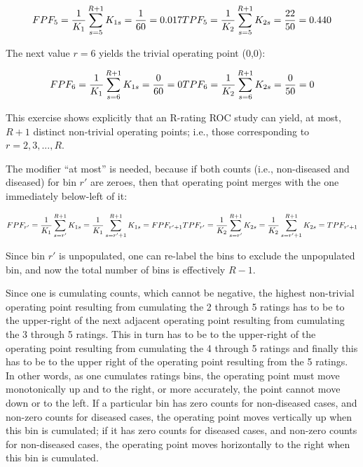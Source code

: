 \documentclass[
]{book}
\begin{document}
\begin{equation*} 
FPF_5=\frac {1} {K_1} \sum_{s=5}^{R+1}K_{1s} = \frac{1}{60} = 0.017\\
TPF_5=\frac {1} {K_2} \sum_{s=5}^{R+1}K_{2s} = \frac{22}{50} = 0.440
\end{equation*}

The next value \(r = 6\) yields the trivial operating point (0,0):

\begin{equation*} 
FPF_6=\frac {1} {K_1} \sum_{s=6}^{R+1}K_{1s} = \frac{0}{60} = 0\\
TPF_6=\frac {1} {K_2} \sum_{s=6}^{R+1}K_{2s} = \frac{0}{50} = 0
\end{equation*}

This exercise shows explicitly that an R-rating ROC study can yield, at most, \(R + 1\) distinct non-trivial operating points; i.e., those corresponding to \(r=2,3,...,R\).

The modifier ``at most'' is needed, because if both counts (i.e., non-diseased and diseased) for bin \(r'\) are zeroes, then that operating point merges with the one immediately below-left of it:

\begin{equation*} 
FPF_{r'}=\frac {1} {K_1} \sum_{s={r'}}^{R+1}K_{1s} = \frac {1} {K_1} \sum_{s={r'+1}}^{R+1}K_{1s} = FPF_{r'+1}\\
\\
TPF_{r'}=\frac {1} {K_2} \sum_{s={r'}}^{R+1}K_{2s} = \frac {1} {K_2} \sum_{s={r'+1}}^{R+1}K_{2s} = TPF_{r'+1}
\end{equation*}

Since bin \(r'\) is unpopulated, one can re-label the bins to exclude the unpopulated bin, and now the total number of bins is effectively \(R-1\).

Since one is cumulating counts, which cannot be negative, the highest non-trivial operating point resulting from cumulating the 2 through 5 ratings has to be to the upper-right of the next adjacent operating point resulting from cumulating the 3 through 5 ratings. This in turn has to be to the upper-right of the operating point resulting from cumulating the 4 through 5 ratings and finally this has to be to the upper right of the operating point resulting from the 5 ratings. In other words, as one cumulates ratings bins, the operating point must move monotonically up and to the right, or more accurately, the point cannot move down or to the left. If a particular bin has zero counts for non-diseased cases, and non-zero counts for diseased cases, the operating point moves vertically up when this bin is cumulated; if it has zero counts for diseased cases, and non-zero counts for non-diseased cases, the operating point moves horizontally to the right when this bin is cumulated.
\end{document}
